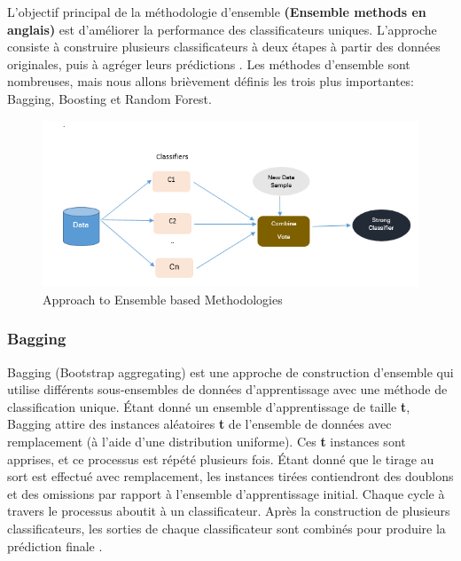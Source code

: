 \documentclass[12pt, french]{report}
\begin{document}
L'objectif principal de la méthodologie d'ensemble \textbf{(Ensemble methods en anglais)} est d'améliorer la performance des classificateurs uniques. L'approche consiste à construire plusieurs classificateurs à deux étapes à partir des données originales, puis à agréger leurs prédictions \cite{key1}. Les méthodes d'ensemble sont nombreuses, mais nous allons brièvement définis les trois plus importantes: Bagging, Boosting et Random Forest. 

\begin{figure}[h]
	\includegraphics{images/ensemble.png}
	\caption{Approach to Ensemble based Methodologies \cite{key19} }
	\label{ensemble}
\end{figure}

\subsubsection{Bagging}
Bagging (Bootstrap aggregating) est une approche de construction d'ensemble qui 
utilise différents sous-ensembles de données d’apprentissage avec une  méthode  de classification unique.  Étant  donné  un  ensemble  d’apprentissage  de  taille \textbf{t}, Bagging attire des instances aléatoires \textbf{t} de l'ensemble de données avec remplacement (à l'aide d'une distribution uniforme). Ces \textbf{t} instances sont apprises, et ce processus est répété plusieurs fois. Étant donné que le tirage au sort est effectué avec remplacement, les   instances   tirées   contiendront des   doublons   et   des   omissions   par   rapport   à l'ensemble  d'apprentissage initial.  Chaque  cycle  à  travers  le  processus  aboutit  à  un classificateur.  Après  la  construction  de  plusieurs  classificateurs,  les  sorties  de  chaque classificateur sont combinés pour produire la prédiction finale \cite{key27}. 
\end{document}
